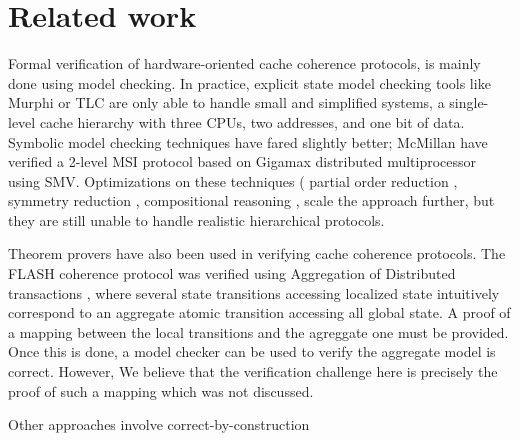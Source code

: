 \section{Related work}
\label{relatedWork}

Formal verification of hardware-oriented cache coherence protocols, is mainly
done using model checking. In practice, explicit state model checking tools like
Murphi \cite{murphi} or TLC \cite{tlc} are only able to handle small and
simplified systems, \eg{} a single-level cache hierarchy with three CPUs, two
addresses, and one bit of data. Symbolic model checking techniques have fared
slightly better; McMillan \etal{} have verified a 2-level MSI protocol based on
Gigamax distributed multiprocessor using SMV.  Optimizations on these techniques
(\eg{} partial order reduction \cite{part}, symmetry reduction \cite{sym1,
  sym2}, compositional reasoning \cite{somethink}, \etc{} scale the approach
further, but they are still unable to handle realistic hierarchical protocols.

Theorem provers have also been used in verifying cache coherence protocols. The
FLASH coherence protocol \cite{flash} was verified using Aggregation of
Distributed transactions \cite{park}, where several state transitions accessing
localized state intuitively correspond to an aggregate atomic transition
accessing all global state. A proof of a mapping between the local transitions
and the agreggate one must be provided. Once this is done, a model checker can
be used to verify the aggregate model is correct. However, We believe that the
verification challenge here is precisely the proof of such a mapping which was
not discussed.

Other approaches involve correct-by-construction


